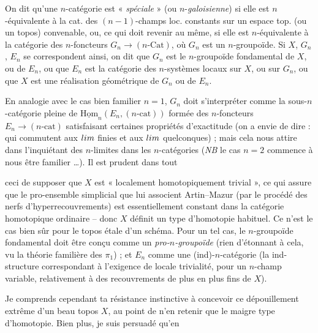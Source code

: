 \documentclass[11pt,a4paper]{article}
\begin{document}
On dit qu'une $n$-catégorie  est « \emph{spéciale} » (ou $n$-\emph{galoisienne}) si elle est $n$-équivalente à la cat. des $(n-1)$-champs loc. constants sur un espace top. (ou un topos) convenable, ou, ce qui doit revenir au même, si elle est $n$-équivalente à la catégorie des $n$-foncteurs $G_n \to (n\text{-Cat})$, où $G_n$ est un $n$-groupoïde. Si $X$, $G_n$, $E_n$ se correspondent ainsi, on dit que  $G_n$ est le $n$-groupoïde fondamental de $X$, ou de $E_n$, ou que $E_n$ est la catégorie des $n$-systèmes locaux sur $X$, ou sur $G_n$, ou que $X$ est une réalisation géométrique de $G_n$ ou de $E_n$.

En analogie avec le cas bien familier $n=1$, $G_n$ doit s'interpréter comme la sous-$n$-catégorie pleine de $\underline{\mathrm{Hom}}_n(E_n, (n\text{-cat}))$ formée des $n$-foncteurs $E_n \to (n\text{-cat})$ satisfaisant certaines propriétés d'exactitude (on a envie de dire : qui commutent aux $\varprojlim$ finies et aux $\varinjlim$ quelconques) ; mais cela nous attire dans l'inquiétant  des $n$-limites dans les $n$-catégories (\emph{NB} le cas $n=2$ commence à nous être familier …). Il est prudent dans tout

ceci de supposer que $X$ est « localement homotopiquement trivial », ce qui assure que le pro-ensemble simplicial que lui associent Artin--Mazur (par le procédé des nerfs d'hyperrecouvrements) est essentiellement constant dans la catégorie homotopique ordinaire -- donc $X$ définit un type d'homotopie habituel. Ce n'est  le cas bien sûr pour le topos étale d'un schéma. Pour un tel cas, le $n$-groupoïde fondamental doit être conçu comme un \emph{pro-$n$-groupoïde} (rien d'étonnant à cela, vu la théorie familière des $\pi_1$) ; et $E_n$ comme une (ind)-$n$-catégorie (la ind-structure correspondant à l'exigence de locale trivialité, pour un $n$-champ variable, relativement à des recouvrements de plus en plus fins de $X$).

Je comprends cependant ta résistance instinctive à concevoir ce dépouillement extrême d'un beau topos $X$, au point de n'en retenir que le maigre type d'homotopie. Bien plus, je suis persuadé qu'en
\end{document}
